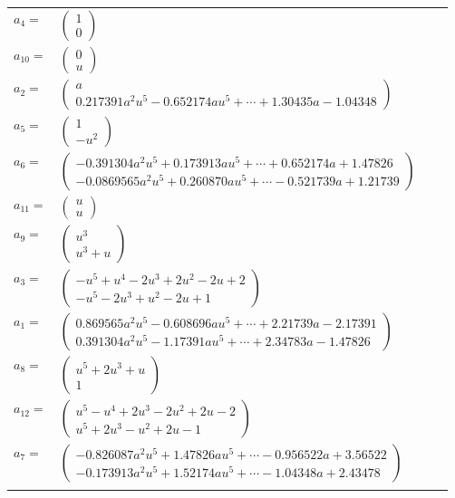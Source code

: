 \documentclass[1p]{elsarticle_modified}
\theoremstyle{definition}
\begin{document}
\begin{tabular}{m{7pt} m{180pt} m{7pt} m{180pt} }
\flushright $a_{4}=$&$\begin{pmatrix}1\\0\end{pmatrix}$ \\
\flushright $a_{10}=$&$\begin{pmatrix}0\\u\end{pmatrix}$ \\
\flushright $a_{2}=$&$\begin{pmatrix}a\\0.217391 a^{2} u^{5}-0.652174 a u^{5}+\cdots+1.30435 a-1.04348\end{pmatrix}$ \\
\flushright $a_{5}=$&$\begin{pmatrix}1\\- u^2\end{pmatrix}$ \\
\flushright $a_{6}=$&$\begin{pmatrix}-0.391304 a^{2} u^{5}+0.173913 a u^{5}+\cdots+0.652174 a+1.47826\\-0.0869565 a^{2} u^{5}+0.260870 a u^{5}+\cdots-0.521739 a+1.21739\end{pmatrix}$ \\
\flushright $a_{11}=$&$\begin{pmatrix}u\\u\end{pmatrix}$ \\
\flushright $a_{9}=$&$\begin{pmatrix}u^3\\u^3+u\end{pmatrix}$ \\
\flushright $a_{3}=$&$\begin{pmatrix}- u^5+u^4-2 u^3+2 u^2-2 u+2\\- u^5-2 u^3+u^2-2 u+1\end{pmatrix}$ \\
\flushright $a_{1}=$&$\begin{pmatrix}0.869565 a^{2} u^{5}-0.608696 a u^{5}+\cdots+2.21739 a-2.17391\\0.391304 a^{2} u^{5}-1.17391 a u^{5}+\cdots+2.34783 a-1.47826\end{pmatrix}$ \\
\flushright $a_{8}=$&$\begin{pmatrix}u^5+2 u^3+u\\1\end{pmatrix}$ \\
\flushright $a_{12}=$&$\begin{pmatrix}u^5- u^4+2 u^3-2 u^2+2 u-2\\u^5+2 u^3- u^2+2 u-1\end{pmatrix}$ \\
\flushright $a_{7}=$&$\begin{pmatrix}-0.826087 a^{2} u^{5}+1.47826 a u^{5}+\cdots-0.956522 a+3.56522\\-0.173913 a^{2} u^{5}+1.52174 a u^{5}+\cdots-1.04348 a+2.43478\end{pmatrix}$\\&\end{tabular}
\end{document}
